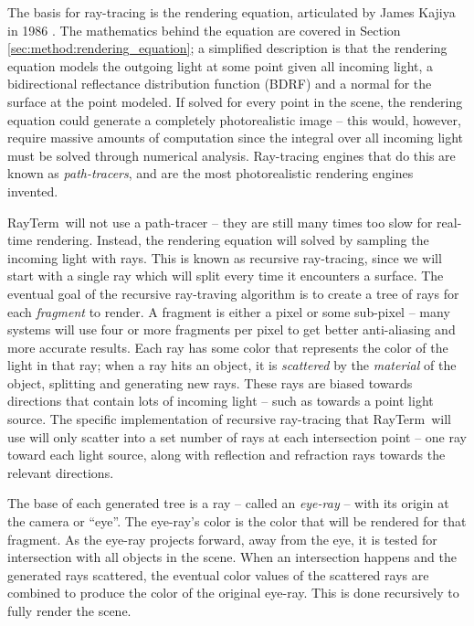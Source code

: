 \documentclass[11pt]{article}
\newcommand{\name}{{\sc RayTerm}}
\begin{document}
The basis for ray-tracing is the rendering equation, articulated by James Kajiya in 1986 \cite{kajiya1986rendering}.
The mathematics behind the equation are covered in Section \ref{sec:method:rendering_equation}; a simplified description is that the rendering equation models the outgoing light at some point given all incoming light, a bidirectional reflectance distribution function (BDRF) and a normal for the surface at the point modeled.
If solved for every point in the scene, the rendering equation could generate a completely photorealistic image -- this would, however, require massive amounts of computation since the integral over all incoming light must be solved through numerical analysis.
Ray-tracing engines that do this are known as {\it path-tracers}, and are the most photorealistic rendering engines invented.

\name\ will not use a path-tracer -- they are still many times too slow for real-time rendering.
Instead, the rendering equation will solved by sampling the incoming light with rays.
This is known as recursive ray-tracing, since we will start with a single ray which will split every time it encounters a surface.
The eventual goal of the recursive ray-traving algorithm is to create a tree of rays for each {\it fragment} to render.
A fragment is either a pixel or some sub-pixel -- many systems will use four or more fragments per pixel to get better anti-aliasing and more accurate results.
Each ray has some color that represents the color of the light in that ray; when a ray hits an object, it is {\it scattered} by the {\it material} of the object, splitting and generating new rays. These rays are biased towards directions that contain lots of incoming light -- such as towards a point light source. The specific implementation of recursive ray-tracing that \name\ will use will only scatter into a set number of rays at each intersection point -- one ray toward each light source, along with reflection and refraction rays towards the relevant directions.

The base of each generated tree is a ray -- called an {\it eye-ray} -- with its origin at the camera or ``eye''.
The eye-ray's color is the color that will be rendered for that fragment.
As the eye-ray projects forward, away from the eye, it is tested for intersection with all objects in the scene.
When an intersection happens and the generated rays scattered, the eventual color values of the scattered rays are combined to produce the color of the original eye-ray. This is done recursively to fully render the scene.
\end{document}
